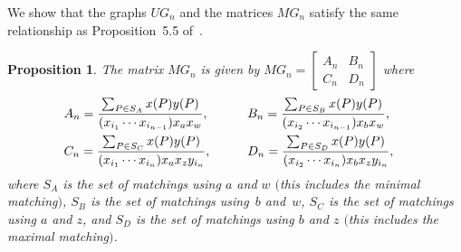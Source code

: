 \documentclass[pdftex]{sigma}%
\numberwithin{equation}{section}
\newtheorem{Proposition}[Theorem]{Proposition}
\begin{document}
We show that the graphs $UG_n$ and the matrices $MG_n$ satisfy the same relationship as Proposition~5.5 of~\cite{MW}.

\begin{Proposition}\label{prop:MatchingMatrices}
The matrix $MG_n$ is given by $MG_n = \left[\begin{smallmatrix} A_n & B_n \\ C_n & D_n \end{smallmatrix}\right]$ where
\begin{alignat*}{3}
& A_n = \frac{\sum_{P \in S_A} x(P) y(P)}{(x_{i_1}\cdots x_{i_{n-1}}) x_ax_w}, \qquad && B_n = \frac{\sum_{P \in S_B} x(P) y(P)}{(x_{i_2}\cdots x_{i_{n-1}}) x_bx_w},&
\vspace{1mm}\\
& C_n = \frac{\sum_{P \in S_C} x(P) y(P)}{(x_{i_1}\cdots x_{i_{n}}) x_ax_z y_{i_n}}, \qquad && D_n = \frac{\sum_{P \in S_D} x(P) y(P)}{(x_{i_2}\cdots x_{i_{n}}) x_bx_z y_{i_n}}, &
\end{alignat*}
where $S_A$ is the set of matchings using $a$ and $w$ $($this includes the minimal matching$)$, $S_B$ is the set of matchings using~$b$ and~$w$, $S_C$ is the set of matchings using $a$ and $z$, and $S_D$ is the set of matchings using $b$ and $z$ $($this includes the maximal matching$)$.
\end{Proposition}
\end{document}
